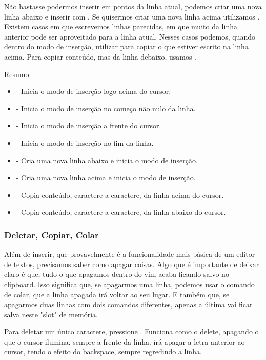 Não bastasse podermos inserir em pontos da linha atual, podemos criar uma nova linha abaixo e inserir com .
Se quisermos criar uma nova linha acima utilizamos .
Existem casos em que escrevemos linhas parecidas, em que muito da linha anterior pode ser aproveitado para a linha atual.
Nesses casos podemos, quando dentro do modo de inserção, utilizar  para copiar o que estiver escrito
na linha acima. Para copiar conteúdo, mas da linha debaixo, usamos .

Resumo:
\begin{itemize}
    \item {} - Inicia o modo de inserção logo acima do cursor.
    \item {} - Inicia o modo de inserção no começo não nulo da linha.
    \item {} - Inicia o modo de inserção a frente do cursor.
    \item {} - Inicia o modo de inserção no fim da linha.
    \item {} - Cria uma nova linha abaixo e inicia o modo de inserção.
    \item {} - Cria uma nova linha acima e inicia o modo de inserção.
    \item {} - Copia conteúdo, caractere a caractere, da linha acima do cursor.
    \item {} - Copia conteúdo, caractere a caractere, da linha abaixo do cursor.
\end{itemize}

\subsubsection{Deletar, Copiar, Colar}
Além de inserir, que provavelmente é a funcionalidade mais básica de um editor de textos, precisamos saber como apagar coisas.
Algo que é importante de deixar claro é que, tudo o que apagamos dentro do vim acaba ficando salvo no clipboard.
Isso significa que, se apagarmos uma linha, podemos usar o comando de colar, que a linha apagada irá voltar ao seu lugar.
E também que, se apagarmos duas linhas com dois comandos diferentes, apenas a última vai ficar salva neste "slot" de memória.

Para deletar um único caractere, pressione .
Funciona como o delete, apagando o que o cursor ilumina, sempre a frente da linha.
 irá apagar a letra anterior ao cursor, tendo o efeito do backspace, sempre regredindo a linha.

